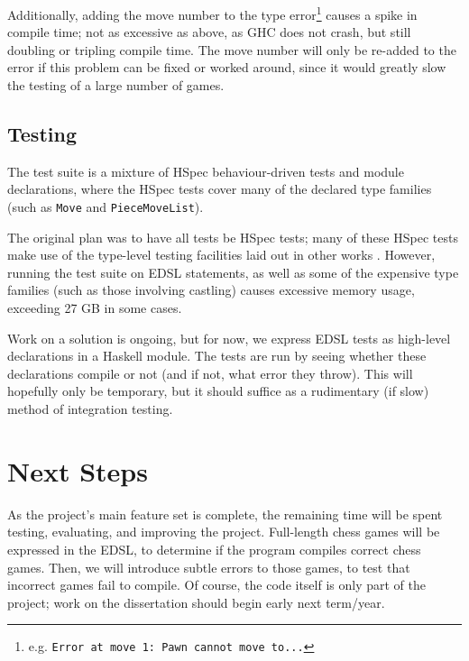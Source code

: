 \documentclass[12pt, a4paper, bibliography=totocnumbered]{scrartcl}
\begin{document}
Additionally, adding the move number to the type error\footnote{e.g. \lstinline{Error at move 1: Pawn cannot move to...}} causes a spike in compile time; not as excessive as above, as GHC does not crash, but still doubling or tripling compile time. The move number will only be re-added to the error if this problem can be fixed or worked around, since it would greatly slow the testing of a large number of games.

\subsection{Testing}

The test suite is a mixture of HSpec behaviour-driven tests \cite{hspec} and module declarations, where the HSpec tests cover many of the declared type families (such as \lstinline{Move} and \lstinline{PieceMoveList}).

The original plan was to have all tests be HSpec tests; many of these HSpec tests make use of the type-level testing facilities laid out in other works \cite{mezzo}. However, running the test suite on EDSL statements, as well as some of the expensive type families (such as those involving castling) causes excessive memory usage, exceeding 27 GB in some cases.

Work on a solution is ongoing, but for now, we express EDSL tests as high-level declarations in a Haskell module. The tests are run by seeing whether these declarations compile or not (and if not, what error they throw). This will hopefully only be temporary, but it should suffice as a rudimentary (if slow) method of integration testing.

\section{Next Steps}

As the project's main feature set is complete, the remaining time will be spent testing, evaluating, and improving the project. Full-length chess games will be expressed in the EDSL, to determine if the program compiles correct chess games. Then, we will introduce subtle errors to those games, to test that incorrect games fail to compile. Of course, the code itself is only part of the project; work on the dissertation should begin early next term/year.

\end{document}
